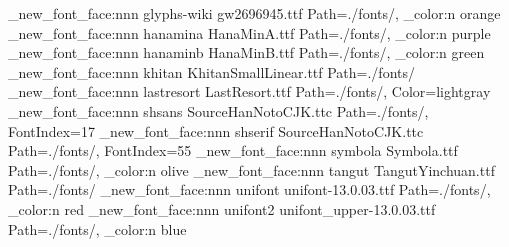 \@@_new_font_face:nnn { glyphs-wiki      } { gw2696945.ttf                } { Path=./fonts/, \@@_color:n { orange } }
\@@_new_font_face:nnn { hanamina         } { HanaMinA.ttf                 } { Path=./fonts/, \@@_color:n { purple } }
\@@_new_font_face:nnn { hanaminb         } { HanaMinB.ttf                 } { Path=./fonts/, \@@_color:n { green  } }
\@@_new_font_face:nnn { khitan           } { KhitanSmallLinear.ttf        } { Path=./fonts/                         }
\@@_new_font_face:nnn { lastresort       } { LastResort.ttf               } { Path=./fonts/, Color=lightgray        }
\@@_new_font_face:nnn { shsans           } { SourceHanNotoCJK.ttc         } { Path=./fonts/, FontIndex=17           }  %
\@@_new_font_face:nnn { shserif          } { SourceHanNotoCJK.ttc         } { Path=./fonts/, FontIndex=55           }  %
\@@_new_font_face:nnn { symbola          } { Symbola.ttf                  } { Path=./fonts/, \@@_color:n { olive  } }
\@@_new_font_face:nnn { tangut           } { TangutYinchuan.ttf           } { Path=./fonts/                         }
\@@_new_font_face:nnn { unifont          } { unifont-13.0.03.ttf          } { Path=./fonts/, \@@_color:n { red    } }
\@@_new_font_face:nnn { unifont2         } { unifont_upper-13.0.03.ttf    } { Path=./fonts/, \@@_color:n { blue   } }
